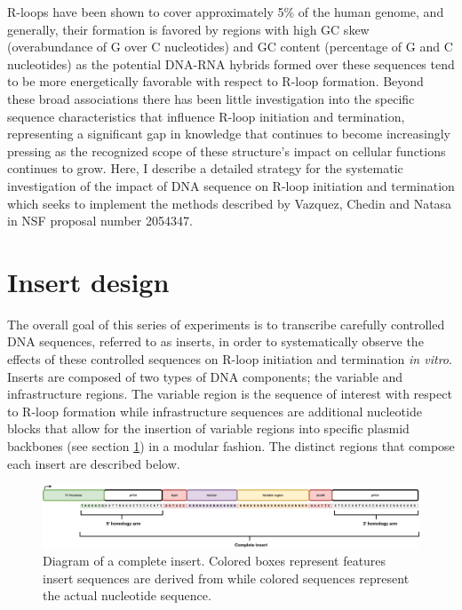 \documentclass[11pt]{article}
\begin{document}
R-loops have been shown to cover approximately 5\% of the human genome, and generally, their formation is favored by regions with high GC skew (overabundance of G over C nucleotides) and GC content (percentage of G and C nucleotides) as the potential DNA-RNA hybrids formed over these sequences tend to be more energetically favorable with respect to R-loop formation\cite{Stolz2019}. Beyond these broad associations there has been little investigation into the specific sequence characteristics that influence R-loop initiation and termination, representing a significant gap in knowledge that continues to become increasingly pressing as the recognized scope of these structure's impact on cellular functions continues to grow. Here, I describe a detailed strategy for the systematic investigation of the impact of DNA sequence on R-loop initiation and termination which seeks to implement the methods described by Vazquez, Chedin and Natasa in NSF proposal number 2054347. 


\section{Insert design}

The overall goal of this series of experiments is to transcribe carefully controlled DNA sequences, referred to as inserts, in order to systematically observe the effects of these controlled sequences on R-loop initiation and termination \emph{in vitro}. Inserts are composed of two types of DNA components; the variable and infrastructure regions. The variable region is the sequence of interest with respect to R-loop formation while infrastructure sequences are additional nucleotide blocks that allow for the insertion of variable regions into specific plasmid backbones (see section \ref{}) in a modular fashion. The distinct regions that compose each insert are described below. 

\begin{figure}[H]
	\includegraphics[width=16cm]{images/variable_region/construct_diagrams-Detailed-Insert.png}
	\centering
	\caption{Diagram of a complete insert. Colored boxes represent features insert sequences are derived from while colored sequences represent the actual nucleotide sequence.}
	\label{fig:1}
\end{figure}
\end{document}
